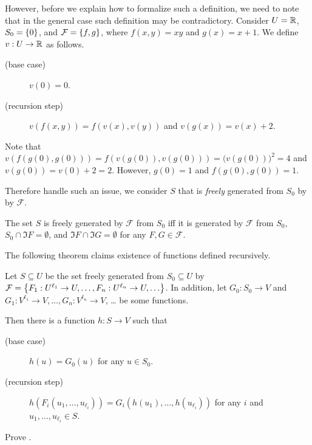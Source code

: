 However, before we explain how to formalize such a definition, we need to note
that in the general case such definition may be contradictory. Consider
$U = {\mathbb{R}}$, $S_0 = \set{0}$, and $\mathcal{F} = \set{f, g}$, where $f(x, y) = xy$
and $g(x) = x + 1$. We define $v : U \to {\mathbb{R}}$ as follows.
\begin{description}
  \item [(base case)] $v(0) = 0$.
  \item[(recursion step)] $v(f(x, y)) = f(v(x), v(y))$ and
    $v(g(x)) = v(x) + 2$.
\end{description}
Note that $v(f(g(0), g(0))) = f(v(g(0)), v(g(0))) = \big(v(g(0))\big)^2 = 4$
and $v(g(0)) = v(0) + 2 = 2$. However, $g(0) = 1$ and $f(g(0), g(0)) = 1$.

Therefore handle such an issue, we consider $S$ that is \emph{freely} generated
from $S_0$ by by $\mathcal{F}$.
\begin{definition}
  The set $S$ is freely generated by $\mathcal{F}$ from $S_0$ iff it is
  generated by $\mathcal{F}$ from $S_0$,
  $S_0 \cap \Im F = \emptyset$, and $\Im F \cap \Im G = \emptyset$ for any
  $F, G \in \mathcal{F}$.
\end{definition}

The following theorem claims existence of functions defined recursively.
\begin{theorem}
\label{theorem:recursion-principle}
  Let $S \subseteq U$ be the set freely generated from $S_0 \subseteq U$ by
  $\mathcal{F} =
    \set{F_1 : U^{\ell_1} \to U, \dots, F_n : U^{\ell_n} \to U, \dots}$.
  In addition, let $G_0 : S_0 \to V$ and
  $G_1 : V^{\ell_1} \to V, \dots, G_n : V^{\ell_n} \to V$, \dots
  be some functions.

  Then there is a function $h : S \to V$ such that
  \begin{description}
        \item [(base case)] $h(u) = G_0(u)$ for any $u \in S_0$.
        \item[(recursion step)] $h(F_i(u_1, \dots, u_{\ell_i})) =
            G_i(h(u_1), \dots, h(u_{\ell_i}))$ for any $i$ and
            $u_1, \dots, u_{\ell_i} \in S$.
  \end{description}
\end{theorem}

\begin{exercise}
  Prove .
\end{exercise}


